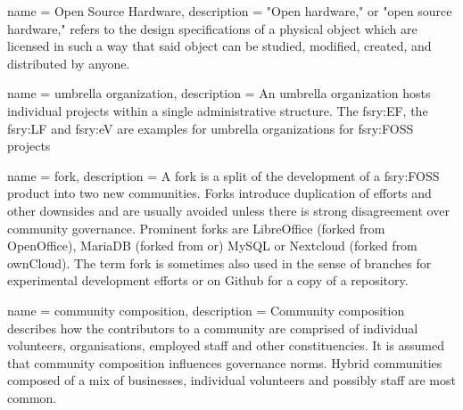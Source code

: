 
 { name = {Open Source Hardware}, description = {
    "Open hardware," or "open source hardware," refers to the design
    specifications of a physical object which are licensed in such a way
    that said object can be studied, modified, created, and distributed by
    anyone.\cite{fsry:open-hardware} } }


 { name = {umbrella organization},
  description = {An umbrella organization hosts individual projects
    within a single administrative structure. The \gls{fsry:EF}, the
    \gls{fsry:LF} and \gls{fsry:eV} are examples for umbrella organizations for
    \gls{fsry:FOSS} projects} }

 { name = {fork}, description = {A fork is
    a split of the development of a \gls{fsry:FOSS} product into two
    new communities. Forks introduce duplication of efforts and other
    downsides and are usually avoided unless there is strong
    disagreement over community governance. Prominent forks are
    LibreOffice (forked from OpenOffice), MariaDB (forked from or)
    MySQL or Nextcloud (forked from ownCloud). The term fork is
    sometimes also used in the sense of branches for experimental
    development efforts or on Github for a copy of a repository.} }

 { name = {community composition},
  description = {Community composition describes how the contributors
    to a community are comprised of individual volunteers,
    organisations, employed staff and other constituencies. It is
    assumed that community composition influences governance
    norms. Hybrid communities composed of a mix of businesses,
    individual volunteers and possibly staff are most common. } }
